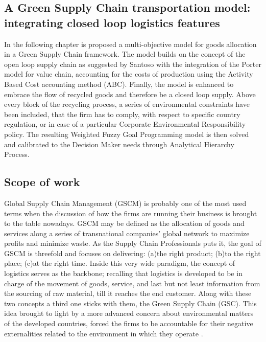 \begin{doublespace}
\chapter{A Green Supply Chain transportation model: integrating closed loop logistics features}
In the following chapter is proposed a multi-objective model for goods allocation in a Green Supply Chain framework. The model builds on the concept of the open loop supply chain as suggested by Santoso with the integration of the Porter model for value chain, accounting for the costs of production using the Activity Based Cost accounting method (ABC). Finally, the model is enhanced to embrace the flow of recycled goods and therefore be a closed loop supply. Above every block of the recycling process, a series of environmental constraints have been included, that the firm has to comply, with respect to specific country regulation, or in case of a particular Corporate Environmental Responsibility policy. The resulting Weighted Fuzzy Goal Programming model is then solved and calibrated to the Decision Maker needs through Analytical Hierarchy Process.

\section{Scope of work}
  Global Supply Chain Management (GSCM) is probably one of the most used terms when the discussion of how the firms are running their business is brought to the table nowadays. GSCM may be defined as the allocation of goods and services along a series of transnational companies' global network to maximize profits and minimize waste. As the Supply Chain Professionals puts it, the goal of GSCM is threefold and focuses on delivering: (a)the right product; (b)to the right place; (c)at the right time.
   Inside this very wide paradigm, the concept of logistics serves as the backbone; recalling that logistics is developed to be in charge of the movement of goods, service, and last but not least information from the sourcing of raw material, till it reaches the end customer.
  Along with these two concepts a third one sticks with them, the Green Supply Chain (GSC). This idea brought to light by a more advanced concern about environmental matters of the developed countries, forced the firms to be accountable for their negative externalities related to the environment in which they operate \cite{Srivastava2007}.


\end{doublespace}
